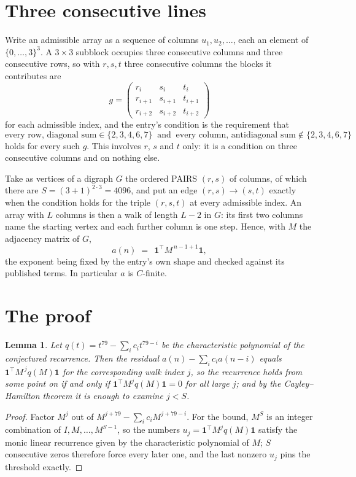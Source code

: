 \documentclass[11pt,a4paper]{article}
\theoremstyle{plain}
\newtheorem{lemma}[theorem]{Lemma}
\theoremstyle{definition}
\begin{document}
\section{Three consecutive lines}

Write an admissible array as a sequence of columns $u_1,u_2,\dots$, each an element of
$\{0,\dots,3\}^{3}$. A $3\times3$ subblock occupies three consecutive columns and
three consecutive rows, so with $r,s,t$ three consecutive columns the blocks it
contributes are
\[
g=\begin{pmatrix}r_i&s_i&t_i\\ r_{i+1}&s_{i+1}&t_{i+1}\\ r_{i+2}&s_{i+2}&t_{i+2}\end{pmatrix}
\]
for each admissible index, and the entry's condition is the requirement that
\[
\text{every row, diagonal sum} \in \{2,3,4,6,7\}\ \text{ and }\ \text{every column, antidiagonal sum} \notin \{2,3,4,6,7\}
\]
holds for every such $g$. This involves $r$, $s$ and $t$ only: it is a condition on
three consecutive columns and on nothing else.

Take as vertices of a digraph $G$ the ordered PAIRS $(r,s)$ of columns, of which there are
$S=(3+1)^{2\cdot3}=4096$, and put an edge $(r,s)\to(s,t)$ exactly when the condition
holds for the triple $(r,s,t)$ at every admissible index. An array with $L$ columns is then a
walk of length $L-2$ in $G$: its first two columns name the starting vertex and each further
column is one step. Hence, with $M$ the adjacency matrix of $G$,
\[
a(n)\;=\;\,\mathbf{1}^{\!\top}M^{\,n-1+1}\mathbf{1},
\]
the exponent being fixed by the entry's own shape and checked against its published terms.
In particular $a$ is $C$-finite.

\section{The proof}

\begin{lemma}\label{lem:crit}
Let $q(t)=t^{79}-\sum_i c_it^{79-i}$ be the characteristic polynomial of the
conjectured recurrence. Then the residual $a(n)-\sum_ic_ia(n-i)$ equals
$\mathbf{1}^{\!\top}M^{\,j}q(M)\mathbf{1}$ for the corresponding walk index
$j$, so the recurrence holds from some point on if and only if
$\mathbf{1}^{\!\top}M^{j}q(M)\mathbf{1}=0$ for all large $j$; and by the
Cayley--Hamilton theorem it is enough to examine $j<S$.
\end{lemma}

\begin{proof}
Factor $M^{j}$ out of $M^{j+79}-\sum_ic_iM^{j+79-i}$. For the bound, $M^{S}$
is an integer combination of $I,M,\dots,M^{S-1}$, so the numbers
$u_j=\mathbf{1}^{\!\top}M^{j}q(M)\mathbf{1}$ satisfy the monic linear recurrence given by
the characteristic polynomial of $M$; $S$ consecutive zeros therefore force every later one,
and the last nonzero $u_j$ pins the threshold exactly.
\end{proof}
\end{document}
